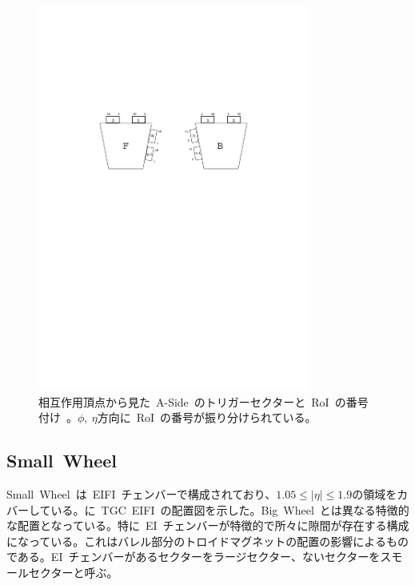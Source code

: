 \begin{figure}[H]
        \centering   
        \includegraphics[width=0.8\textwidth,page=8]{img/pdf/TGC.pdf}
        \caption[トリガーセクターと~RoI~の番号付け]{相互作用頂点から見た~A-Side~のトリガーセクターと~RoI~の番号付け~\cite{TR:02}。$\phi,~\eta$方向に~RoI~の番号が振り分けられている。}
        \label{fig:tgcsector}
\end{figure}

\subsection{Small~Wheel}
Small~Wheel~は~EIFI~チェンバーで構成されており、$1.05{\leq}|\eta|{\leq}1.9$の領域をカバーしている。に~TGC~EIFI~の配置図を示した。Big~Wheel~とは異なる特徴的な配置となっている。特に~EI~チェンバーが特徴的で所々に隙間が存在する構成になっている。これはバレル部分のトロイドマグネットの配置の影響によるものである。EI~チェンバーがあるセクターをラージセクター、ないセクターをスモールセクターと呼ぶ。


